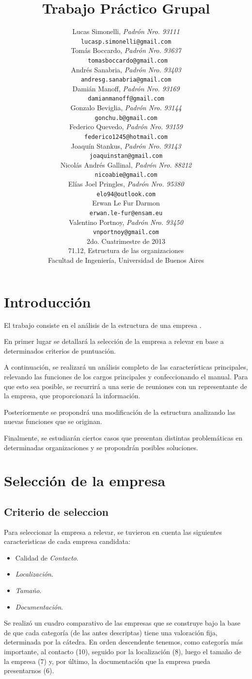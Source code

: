 \documentclass[a4paper,10pt]{article}
\title{		\textbf{Trabajo Práctico Grupal}}
\author{	Lucas Simonelli, \textit{Padrón Nro. 93111}                     \\
            \texttt{ lucasp.simonelli@gmail.com }                                              \\[2.5ex]
            Tomás Boccardo, \textit{Padrón Nro. 93637}                     \\
            \texttt{ tomasboccardo@gmail.com}                                              \\[2.5ex]
            Andrés Sanabria, \textit{Padrón Nro. 93403}                     \\
            \texttt{ andresg.sanabria@gmail.com  }                                              \\[2.5ex]
            Damián Manoff, \textit{Padrón Nro. 93169}                     \\
            \texttt{ damianmanoff@gmail.com  }                                              \\[2.5ex]
            Gonzalo Beviglia, \textit{Padrón Nro. 93144}                     \\
            \texttt{ gonchu.b@gmail.com  }                                              \\[2.5ex]
            Federico Quevedo, \textit{Padrón Nro. 93159}                     \\
            \texttt{ federico1245@hotmail.com  }                                              \\[2.5ex]
            Joaquín Stankus, \textit{Padrón Nro. 93143}                     \\
            \texttt{ joaquinstan@gmail.com  }                                              \\[2.5ex]
            Nicolás Andrés Gallinal, \textit{Padrón Nro. 88212}                \\
            \texttt{ nicoabie@gmail.com }                                              \\[2.5ex]
            Elías Joel Pringles, \textit{Padrón Nro. 95380}                \\
            \texttt{ elo94@outlook.com }                                              \\[2.5ex]   
          Erwan Le Fur Darmon								               \\
            \texttt{ erwan.le-fur@ensam.eu }                                              \\[2.5ex]   
Valentino Portnoy, \textit{Padrón Nro. 93450}                     \\
            \texttt{ vnportnoy@gmail.com  }                                              \\[2.5ex]
            \normalsize{2do. Cuatrimestre de 2013}                                      \\
            \normalsize{71.12, Estructura de las organizaciones}  \\
            \normalsize{Facultad de Ingeniería, Universidad de Buenos Aires}            \\
       }
\date{}
\begin{document}
\maketitle
\thispagestyle{empty}   %


\newpage
\tableofcontents
\newpage
\section{Introducción}
El trabajo consiste en el análisis de la estructura de una empresa .

En primer lugar se detallará la selección de la empresa a relevar en base a determinados criterios de puntuación.

A continuación, se realizará un análisis completo de las características principales, relevando las funciones de los cargos principales y confeccionando el manual. Para que esto sea posible, se recurrirá a una serie de reuniones con un representante de la empresa, que proporcionará la información.

Posteriormente se propondrá una modificación de la estructura analizando las nuevas funciones que se originan.

Finalmente, se estudiarán ciertos casos que presentan distintas problemáticas en determinadas organizaciones y se propondrán posibles soluciones.

\newpage
\section{Selección de la empresa}

\subsection{Criterio de seleccion}

Para seleccionar la empresa a relevar, se tuvieron en cuenta las siguientes caracteristicas de cada empresa candidata:

\begin{itemize}
\item Calidad de \emph{Contacto}. 
\item \emph{Localización}.
\item \emph{Tamaño}.
\item \emph{Documentación}. 
\end{itemize}

Se realizó un cuadro comparativo de las empresas que se construye bajo la base de que cada categoría (de las antes descriptas) tiene una valoración fija, determinada por la cátedra. En orden descendente tenemos, como categoría más importante, al contacto (10), seguido por la localización (8), luego el tamaño de la empresa (7) y, por último, la documentación que la empresa pueda presentarnos (6).
\end{document}
